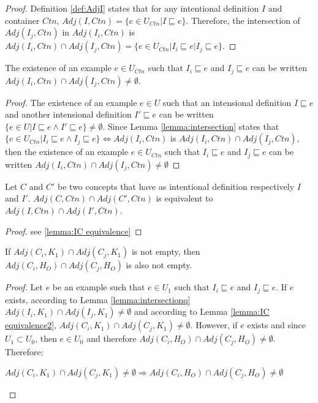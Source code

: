 \begin{proof}
Definition \ref{def:AdjI} states that for any intentional definition $I$ and container $Ctn$, $Adj(I,Ctn) = \{ e \in U_{Ctn} | I \sqsubseteq e \}$. Therefore, the intersection of $Adj(I_{j},Ctn)$ in $Adj(I_{i},Ctn)$ is $Adj(I_{i}, Ctn) \cap Adj(I_{j}, Ctn) = \{ e \in U_{Ctn} | I_{i} \sqsubseteq e | I_{j} \sqsubseteq e \}$.
\end{proof}

\begin{lemma}\label{lemma:intersectionq}
The existence of an example $e \in U_{Ctn}$ such that $I_{i} \sqsubseteq e$ and $I_{j} \sqsubseteq e$ can be written $Adj(I_{i}, Ctn) \cap Adj(I_{j}, Ctn) \neq \emptyset$.
\end{lemma}

\begin{proof}
The existence of an example $e \in U$ such that an intensional definition $I \sqsubseteq e$ and another intensional definition $I' \sqsubseteq e$ can be written $\{ e \in U | I \sqsubseteq e \wedge I' \sqsubseteq e \} \neq \emptyset$. Since Lemma \ref{lemma:intersection} states that $\{ e \in U_{Ctn} | I_{i} \sqsubseteq e \wedge I_{j} \sqsubseteq e \} \Leftrightarrow Adj(I_{i},Ctn)$ is $Adj(I_{i}, Ctn) \cap Adj(I_{j}, Ctn)$, then the existence of an example $e \in U_{Ctn}$ such that $I_{i} \sqsubseteq e$ and $I_{j} \sqsubseteq e$ can be written $Adj(I_{i}, Ctn) \cap Adj(I_{j}, Ctn) \neq \emptyset$
\end{proof}

\begin{lemma}\label{lemma:IC equivalence2}
Let $C$ and $C'$ be two concepts that have as intentional definition respectively $I$ and $I'$. $Adj(C, Ctn) \cap Adj(C', Ctn)$ is equivalent to $Adj(I, Ctn) \cap Adj(I', Ctn)$.
\end{lemma}

\begin{proof}
see \ref{lemma:IC equivalence}
\end{proof}

\begin{lemma}\label{lemma:inter11}
If $Adj(C_{i}, K_{1}) \cap Adj(C_{j}, K_{1})$ is not  empty, then $Adj(C_{i}, H_{O}) \cap Adj(C_{j}, H_{O})$ is also not empty.
\end{lemma}

\begin{proof}
Let $e$ be an example such that $e \in U_{1}$ such that $I_{i} \sqsubseteq e$ and $I_{j} \sqsubseteq e$. If $e$ exists, according to Lemma \ref{lemma:intersectionq} $Adj(I_{i}, K_{1}) \cap Adj(I_{j}, K_{1}) \neq \emptyset$ and according to Lemma \ref{lemma:IC equivalence2}, $Adj(C_{i}, K_{1}) \cap Adj(C_{j}, K_{1}) \neq \emptyset$. However, if $e$ exists and since $U_{1} \subset U_{0}$, then $e \in U_{0}$ and therefore $Adj(C_{i}, H_{O}) \cap Adj(C_{j}, H_{O}) \neq \emptyset$. Therefore:

\begin{center}
$Adj(C_{i}, K_{1}) \cap Adj(C_{j}, K_{1}) \neq \emptyset \Rightarrow Adj(C_{i}, H_{O}) \cap Adj(C_{j}, H_{O}) \neq \emptyset$
\end{center}
\end{proof}

